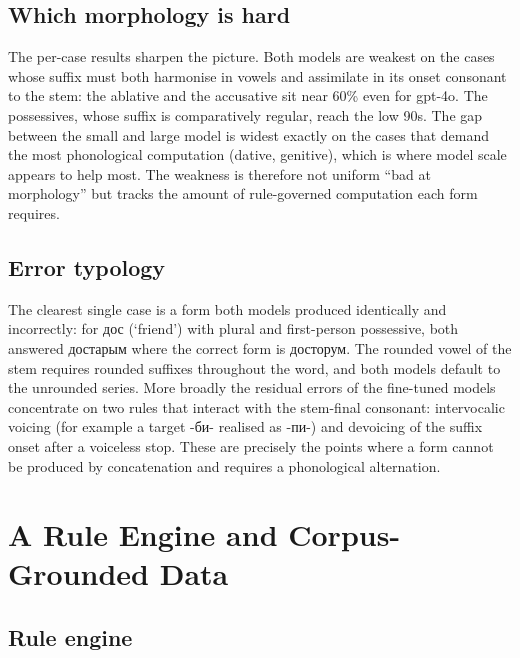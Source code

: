 \documentclass{article}
\newcommand{\ky}[1]{\foreignlanguage{russian}{#1}}
\begin{document}
\subsection{Which morphology is hard}

The per-case results sharpen the picture. Both models are weakest on the cases whose
suffix must both harmonise in vowels and assimilate in its onset consonant to the
stem: the ablative and the accusative sit near 60\% even for gpt-4o. The possessives,
whose suffix is comparatively regular, reach the low 90s. The gap between the small and
large model is widest exactly on the cases that demand the most phonological
computation (dative, genitive), which is where model scale appears to help most. The
weakness is therefore not uniform ``bad at morphology'' but tracks the amount of
rule-governed computation each form requires.

\subsection{Error typology}

The clearest single case is a form both models produced identically and incorrectly:
for \ky{дос} (`friend') with plural and first-person possessive, both answered
\ky{достарым} where the correct form is \ky{досторум}. The rounded vowel of the stem
requires rounded suffixes throughout the word, and both models default to the
unrounded series. More broadly the residual errors of the fine-tuned models concentrate
on two rules that interact with the stem-final consonant: intervocalic voicing (for
example a target \ky{-би-} realised as \ky{-пи-}) and devoicing of the suffix onset
after a voiceless stop. These are precisely the points where a form cannot be produced
by concatenation and requires a phonological alternation.

\section{A Rule Engine and Corpus-Grounded Data}
\label{sec:data}

\subsection{Rule engine}
\end{document}
